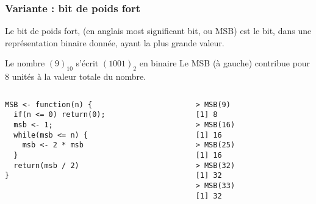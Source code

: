 \documentclass[10pt]{beamer}
\begin{document}
\begin{frame}[fragile]
  \frametitle{Variante : bit de poids fort}
  Le bit de poids fort, (en anglais \alert{most significant bit}, ou MSB) est le bit, dans une représentation binaire donnée, ayant la plus grande valeur.

  \begin{exampleblock}{Le nombre $(9)_{10}$ s'écrit $(1001)_2$ en binaire}
    Le MSB (à gauche) contribue pour 8 unités à la valeur totale du nombre.
  \end{exampleblock}


\begin{columns}[t]
\begin{column}{0.62\textwidth}
\begin{lstlisting}[style=editor]
MSB <- function(n) {
  if(n <= 0) return(0);
  msb <- 1;
  while(msb <= n) {
    msb <- 2 * msb
  }
  return(msb / 2)
}  
\end{lstlisting}
\end{column}
\begin{column}{0.38\textwidth}
  \begin{lstlisting}
> MSB(9)
[1] 8
> MSB(16)
[1] 16
> MSB(25)
[1] 16
> MSB(32)
[1] 32
> MSB(33)
[1] 32
\end{lstlisting}
\end{column}
\end{columns}
\end{frame}
\end{document}
